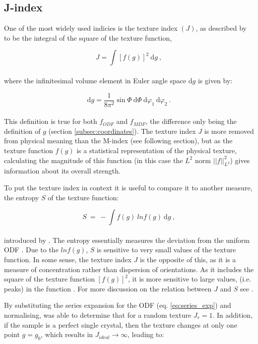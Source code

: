 \documentclass[a4paper,12pt]{report}
\numberwithin{equation}{chapter}
\begin{document}
\subsection{J-index} \label{subsec:j-index}
 One of the most widely used indicies is the texture index $(J)$, as described by \cite{bunge1982texture} to be the integral of the square of the texture function,

\begin{equation}
J = \int [ f(g) ]^2\ \mathrm{d}g \ ,
\end{equation} 
\\
where the infinitesimal volume element in Euler angle space $\mathrm{d}g$ is given by:

\begin{equation}
\mathrm{d}g = \frac{1}{8\pi^2} \sin\Phi\ \mathrm{d}\Phi\ \mathrm{d}\varphi_1\ \mathrm{d}\varphi_2\ .
\end{equation} 
\\
This definition is true for both $f_{ODF}$ and $f_{MDF}$, the difference only being the definition of $g$ (section \ref{subsec:coordinates}). The texture index $J$ is more removed from physical meaning than the M-index (see following section), but as the texture function $f(g)$ is a statistical representation of the physical texture, calculating the magnitude of this function (in this case the $L^2$ norm $||f||^2_{L^2}$) gives information about its overall strength.

To put the texture index in context it is useful to compare it to another measure, the entropy $S$ of the texture function:

\begin{equation}
S\ =\ -\int f(g)\ ln f(g)\ \mathrm{d}g\ ,
\end{equation}
\\
introduced by \cite{Schaeben1988}. The entropy essentially measures the deviation from the uniform ODF \citep[lack of \lq{}organisation\rq{} of orientations,][]{Hielscher2007}. Due to the $ln f(g)$, $S$ is sensitive to very small values of the texture function. In some sense, the texture index $J$ is the opposite of this, as it is a measure of concentration rather than dispersion of orientations. As it includes the square of the texture function $[f(g)]^2$, it is more sensitive to large values, (i.e. peaks) in the function \citep{Mainprice}. For more discussion on the relation between $J$ and $S$ see \cite{Hielscher2007}. 

By substituting the series expansion for the ODF (eq. \ref{eq:series_exp})  and normalising, \cite{bunge1982texture} was able to determine that for a random texture $J_r = 1$. In addition, if the sample is a perfect single crystal, then the texture changes at only one point $g = g_0$, which results in $J_{ideal} \to \infty$, leading to:
\end{document}
